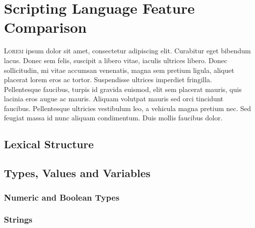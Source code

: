 \section{Scripting Language Feature Comparison}



\lettrine[nindent=0em,lines=3]{L}{orem} ipsum dolor sit amet, consectetur adipiscing elit. Curabitur eget bibendum lacus. Donec sem felis, suscipit a libero vitae, iaculis ultrices libero. Donec sollicitudin, mi vitae accumsan venenatis, magna sem pretium ligula, aliquet placerat lorem eros ac tortor. Suspendisse ultrices imperdiet fringilla. Pellentesque faucibus, turpis id gravida euismod, elit sem placerat mauris, quis lacinia eros augue ac mauris. Aliquam volutpat mauris sed orci tincidunt faucibus. Pellentesque ultricies vestibulum leo, a vehicula magna pretium nec. Sed feugiat massa id nunc aliquam condimentum. Duis mollis faucibus dolor.

\subsection{Lexical Structure}

\subsection{Types, Values and Variables}
\subsubsection{Numeric and Boolean Types}

\subsubsection{Strings}

